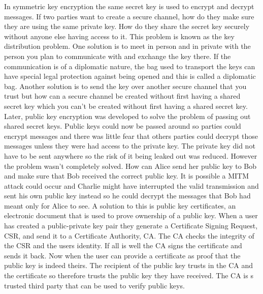 In symmetric key encryption the same secret key is used to encrypt and decrypt messages. If two parties want to create a secure channel, how do they make sure they are using the same private key. How do they share the secret key securely without anyone else having access to it. This problem is known as the key distribution problem. One solution is to meet in person and in private with the person you plan to communicate with and exchange the key there. If the communication is of a diplomatic nature, the bag used to transport the keys can have special legal protection against being opened and this is called a diplomatic bag\cite{dipbag}. Another solution is to send the key over another secure channel that you trust but how can a secure channel be created without first having a shared secret key which you can't be created without first having a shared secret key. Later, public key encryption was developed to solve the problem of passing out shared secret keys. Public keys could now be passed around so parties could encrypt messages and there was little fear that others parties could decrypt those messages unless they were had access to the private key. The private key did not have to be sent anywhere so the risk of it being leaked out was reduced. However the problem wasn't completely solved. How can Alice send her public key to Bob and make sure that Bob received the correct public key. It is possible a MITM attack could occur and Charlie might have interrupted the valid transmission and sent his own public key instead so he could decrypt the messages that Bob had meant only for Alice to see. A solution to this is public key certificates, an electronic document that is used to prove ownership of a public key.  When a user has created a public-private key pair they generate a Certificate Signing Request, CSR, and send it to a Certificate Authority, CA. The CA checks the integrity of the CSR and the users identity. If all is well the CA signs the certificate and sends it back. Now when the user can provide a certificate as proof that the public key is indeed theirs. The recipient of the public key trusts in the CA and the certificate so therefore trusts the public key they have received. The CA is s trusted third party that can be used to verify public keys.
